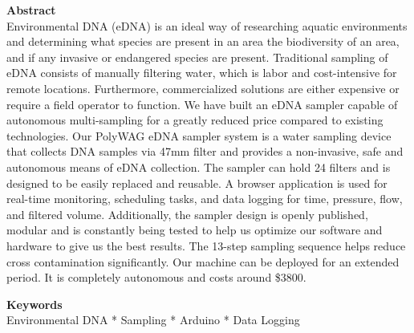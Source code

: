 \documentclass[11pt, letterpaper]{article}
\begin{document}
\begin{flushleft}
%
%
\textbf{Abstract} \\ 
Environmental DNA (eDNA) is an ideal way of researching aquatic environments and determining what species are present in an area the biodiversity of an area, and if any invasive or endangered species are present. Traditional sampling of eDNA consists of manually filtering water,  which is labor and cost-intensive for remote locations. Furthermore, commercialized solutions  are either expensive or require a field operator to function.  We have built an eDNA sampler capable of autonomous multi-sampling for a greatly reduced price compared to existing technologies. Our PolyWAG eDNA sampler system is a water sampling device that collects DNA samples via 47mm filter and provides a non-invasive, safe and autonomous means of eDNA collection. The sampler can hold 24 filters and is designed to be easily replaced and reusable. A browser application is used for real-time monitoring, scheduling tasks, and data logging for time, pressure, flow, and filtered volume. Additionally, the sampler design is openly published, modular and is constantly being tested to help us optimize our software and hardware to give us the best results. The 13-step  sampling sequence helps reduce cross contamination significantly. Our machine can be deployed for an extended period. It is completely autonomous and costs around \$3800.


%
%
\textbf{Keywords} \\
Environmental DNA * Sampling * Arduino * Data Logging \\



\end{flushleft}
\end{document}
